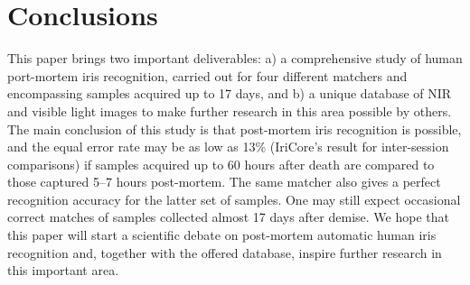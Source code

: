 \documentclass[10pt,twocolumn,letterpaper]{article}
\begin{document}
%
%
%


\section{Conclusions}

This paper brings two important deliverables: a) a comprehensive study of human port-mortem iris recognition, carried out for four different matchers and encompassing samples acquired up to 17 days, and b) a unique database of NIR and visible light images to make further research in this area possible by others. The main conclusion of this study is that post-mortem iris recognition is possible, and the equal error rate may be as low as 13\% (IriCore's result for inter-session comparisons) if samples acquired up to 60 hours after death are compared to those captured 5--7 hours post-mortem. The same matcher also gives a perfect recognition accuracy for the latter set of samples. One may still expect occasional correct matches of samples collected almost 17 days after demise. We hope that this paper will start a scientific debate on post-mortem automatic human iris recognition and, together with the offered database, inspire further research in this important area.



{\small


}
\end{document}
